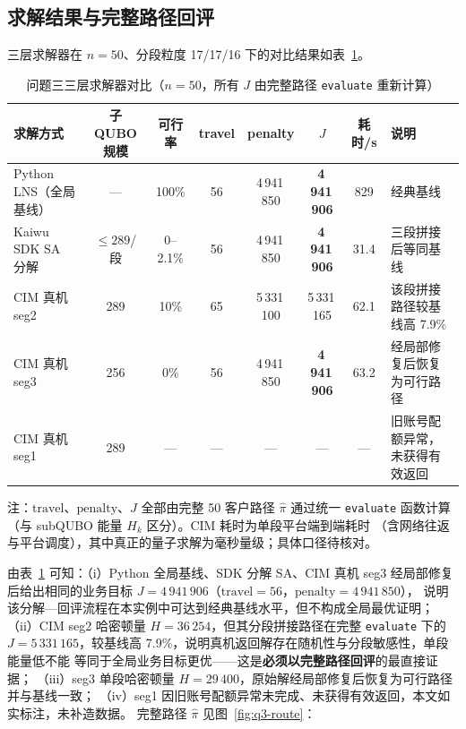 \documentclass[UTF8,12pt,a4paper]{ctexart}
\begin{document}
\subsection{求解结果与完整路径回评}
\label{subsec:q3-result}

三层求解器在 $n=50$、分段粒度 17/17/16 下的对比结果如表~\ref{tab:q3-cmp}。

\begin{table}[H]
  \centering
  \caption{问题三三层求解器对比（$n=50$，所有 $J$ 由完整路径 \texttt{evaluate} 重新计算）}
  \label{tab:q3-cmp}
  \footnotesize
  \begin{tabular}{lccccccl}
    \toprule
    求解方式 & 子 QUBO 规模 & 可行率 & travel & penalty & $J$ & 耗时/s & 说明 \\
    \midrule
    Python LNS（全局基线）  & ---            & 100\%  & 56 & 4\,941\,850 & \textbf{4\,941\,906} & 829   & 经典基线 \\
    Kaiwu SDK SA 分解       & $\le 289$/段   & 0--2.1\% & 56 & 4\,941\,850 & \textbf{4\,941\,906} & 31.4  & 三段拼接后等同基线 \\
    CIM 真机 seg2           & 289           & 10\%    & 65 & 5\,331\,100 & 5\,331\,165         & 62.1  & 该段拼接路径较基线高 7.9\% \\
    CIM 真机 seg3           & 256           & 0\%    & 56 & 4\,941\,850 & \textbf{4\,941\,906} & 63.2  & 经局部修复后恢复为可行路径 \\
    CIM 真机 seg1           & 289           & ---    & --- & ---        & ---                 & ---   & 旧账号配额异常，未获得有效返回 \\
    \bottomrule
  \end{tabular}
  \begin{flushleft}\footnotesize
  注：$\mathrm{travel}$、$\mathrm{penalty}$、$J$ 全部由完整 50 客户路径 $\hat\pi$ 通过统一
  \texttt{evaluate} 函数计算（与 subQUBO 能量 $H_k$ 区分）。CIM 耗时为单段平台端到端耗时
  （含网络往返与平台调度），其中真正的量子求解为毫秒量级；具体口径待核对。
  \end{flushleft}
\end{table}

由表~\ref{tab:q3-cmp} 可知：（i）Python 全局基线、SDK 分解 SA、CIM 真机 seg3 经局部修复
后给出相同的业务目标 $J=4\,941\,906$（$\mathrm{travel}=56$，$\mathrm{penalty}=4\,941\,850$），
说明该分解—回评流程在本实例中可达到经典基线水平，但不构成全局最优证明；
（ii）CIM seg2 哈密顿量 $H=36\,254$，但其分段拼接路径在完整 \texttt{evaluate} 下的
$J=5\,331\,165$，较基线高 7.9\%，说明真机返回解存在随机性与分段敏感性，单段能量低不能
等同于全局业务目标更优——这是\textbf{必须以完整路径回评}的最直接证据；
（iii）seg3 单段哈密顿量 $H=29\,400$，原始解经局部修复后恢复为可行路径并与基线一致；
（iv）seg1 因旧账号配额异常未完成、未获得有效返回，本文如实标注，未补造数据。
完整路径 $\hat\pi$ 见图~\ref{fig:q3-route}：
\end{document}
